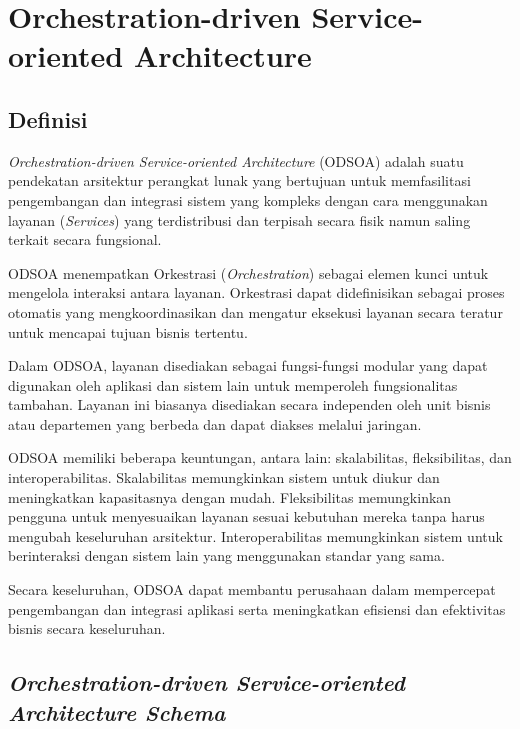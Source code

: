 \chapter{Orchestration-driven Service-oriented Architecture}


\section{Definisi}
\textit{Orchestration-driven Service-oriented Architecture} (ODSOA) adalah suatu pendekatan arsitektur perangkat lunak yang bertujuan untuk memfasilitasi pengembangan dan integrasi sistem yang kompleks dengan cara menggunakan layanan (\textit{Services}) yang terdistribusi dan terpisah secara fisik namun saling terkait secara fungsional.

ODSOA menempatkan Orkestrasi (\textit{Orchestration}) sebagai elemen kunci untuk mengelola interaksi antara layanan. Orkestrasi dapat didefinisikan sebagai proses otomatis yang mengkoordinasikan dan mengatur eksekusi layanan secara teratur untuk mencapai tujuan bisnis tertentu.

Dalam ODSOA, layanan disediakan sebagai fungsi-fungsi modular yang dapat digunakan oleh aplikasi dan sistem lain untuk memperoleh fungsionalitas tambahan. Layanan ini biasanya disediakan secara independen oleh unit bisnis atau departemen yang berbeda dan dapat diakses melalui jaringan.

ODSOA memiliki beberapa keuntungan, antara lain: skalabilitas, fleksibilitas, dan interoperabilitas. Skalabilitas memungkinkan sistem untuk diukur dan meningkatkan kapasitasnya dengan mudah. Fleksibilitas memungkinkan pengguna untuk menyesuaikan layanan sesuai kebutuhan mereka tanpa harus mengubah keseluruhan arsitektur. Interoperabilitas memungkinkan sistem untuk berinteraksi dengan sistem lain yang menggunakan standar yang sama.

Secara keseluruhan, ODSOA dapat membantu perusahaan dalam mempercepat pengembangan dan integrasi aplikasi serta meningkatkan efisiensi dan efektivitas bisnis secara keseluruhan.
	
\section{\textit{Orchestration-driven Service-oriented Architecture Schema}}

